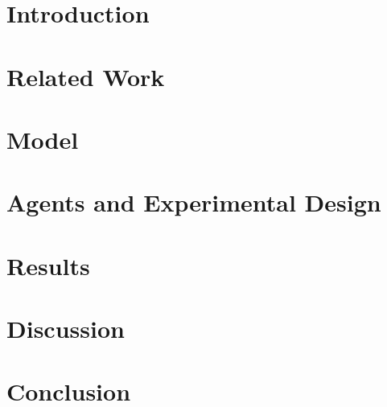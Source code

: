 \documentclass[runningheads]{llncs}
\begin{document}
\title{}
\titlerunning{}

\author{Author Name}

\maketitle

\begin{abstract}
\keywords{}
\end{abstract}

\section{Introduction}

\section{Related Work}

\section{Model}

\section{Agents and Experimental Design}

\section{Results}

\section{Discussion}

\section{Conclusion}

\begin{credits}
\subsubsection{\ackname}
\subsubsection{\discintname}
\end{credits}



\end{document}
